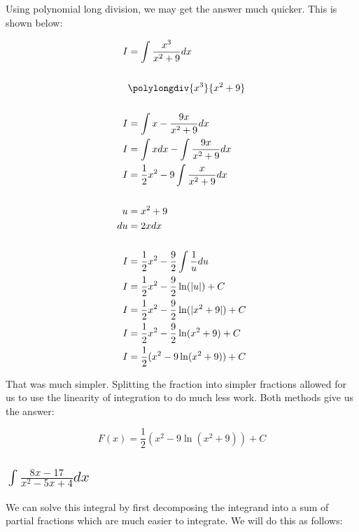 \documentclass[12pt]{article}
\begin{document}
Using polynomial long division, we may get the answer much quicker. This is shown below:


\begin{align}
    I  & = \int \frac{x^3}{x^2+9} dx                        \\
    \nonumber                                               \\
       & {\polylongdiv{x^3}{x^2+9}}                         \\
    \nonumber                                               \\
    I  & = \int x - \frac{9x}{x^2+9} dx                     \\
    I  & = \int x dx - \int \frac{9x}{x^2+9} dx             \\
    I  & = \frac{1}{2}x^2 - 9\int \frac{x}{x^2+9} dx        \\
    \nonumber                                               \\
    u  & = x^2+9                                            \\
    du & = 2x dx                                            \\
    \nonumber                                               \\
    I  & = \frac{1}{2}x^2 - \frac{9}{2} \int \frac{1}{u} du \\
    I  & = \frac{1}{2}x^2 - \frac{9}{2} \ln(|u|) + C        \\
    I  & = \frac{1}{2}x^2 - \frac{9}{2} \ln(|x^2+9|) + C    \\
    I  & = \frac{1}{2}x^2 - \frac{9}{2} \ln(x^2+9) + C      \\
    I  & = \frac{1}{2}(x^2 - 9\ln(x^2+9)) + C
\end{align}


That was much simpler. Splitting the fraction into simpler fractions allowed for us to use the linearity of integration to do much less work. Both methods give us the answer:

$$
    F(x) = \frac{1}{2}(x^2 - 9\ln(x^2+9)) + C
$$

\subsection{$\int \frac{8x-17}{x^2-5x+4} dx$}

We can solve this integral by first decomposing the integrand into a sum of partial fractions which are much easier to integrate.
We will do this as follows:
\end{document}
